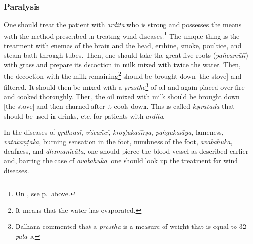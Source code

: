 \begin{translation}
\begin{tt}
\item[20]
\item[21]

\subsubsection{Paralysis}

\item[22] One should treat the patient with \textit{ardita} %
who is strong and possesses the means with the method prescribed in
treating wind diseases.\footnote{On , see
    p.\,\pageref{ardita} above.} The unique thing is the treatment with
    enemas of the brain and the head, errhine, smoke, poultice, and steam
    bath through tubes. Then, one should take the great five roots
    (\textit{pañcamūlī}) with grass and prepare its decoction in milk
    mixed with twice the water. Then, the decoction with the milk
    remaining\footnote{It means that the water has evaporated.} should be
        brought down [the stove] and filtered. It should then be mixed with a
        \textit{prastha}\footnote{Ḍalhana commented \citep[425]{vulgate} that
            a \textit{prastha} is a measure of weight that is equal to 32
            \textit{pala-s}.} of oil and again placed over fire and cooked
            thoroughly. Then, the oil mixed with milk should be brought down [the
            stove] and then churned after it cools down. This is called
            \textit{kṣīrataila} that should be used in drinks, etc. for patients
            with \textit{ardita}.

\item[23]

In the diseases of \textit{gṛdhrasī}, \textit{viścañcī},
\textit{kroṣṭukaśīrṣa}, \textit{paṅgukalāya}, lameness,
\textit{vātakaṇṭaka}, burning sensation in the foot, numbness of the
foot, \textit{avabāhuka}, deafness, and \textit{dhamanīvāta}, one
should pierce the blood vessel as described earlier and, barring the
case of \textit{avabāhuka}, one should look up the treatment for wind
diseases.

\item[24]


\end{tt}
\end{translation}
